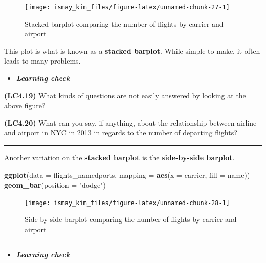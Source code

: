 \documentclass[]{tufte-book}
\newenvironment{Shaded}{\begin{snugshade}}{\end{snugshade}}
\newcommand{\KeywordTok}[1]{\textcolor[rgb]{0.13,0.29,0.53}{\textbf{{#1}}}}
\newcommand{\DataTypeTok}[1]{\textcolor[rgb]{0.13,0.29,0.53}{{#1}}}
\newcommand{\StringTok}[1]{\textcolor[rgb]{0.31,0.60,0.02}{{#1}}}
\newcommand{\NormalTok}[1]{{#1}}
\newenvironment{rmdblock}[1]
  {\begin{shaded*}
  \begin{itemize}
  \renewcommand{\labelitemi}{
    \raisebox{-.7\height}[0pt][0pt]{
    }
  }
  \item
  }
  {
  \end{itemize}
  \end{shaded*}
  }
\newenvironment{learncheck}
  {\begin{rmdblock}{warning}}
  {\end{rmdblock}}
\begin{document}
\begin{figure}
\texttt{[image: ismay\_kim\_files/figure-latex/unnamed-chunk-27-1]} \caption[Stacked barplot comparing the number of flights by carrier and airport]{Stacked barplot comparing the number of flights by carrier and airport}\label{fig:unnamed-chunk-27}
\end{figure}

This plot is what is known as a \textbf{stacked barplot}. While simple
to make, it often leads to many problems.

\begin{learncheck}
\textbf{\emph{Learning check}}
\end{learncheck}

\textbf{(LC4.19)} What kinds of questions are not easily answered by
looking at the above figure?

\textbf{(LC4.20)} What can you say, if anything, about the relationship
between airline and airport in NYC in 2013 in regards to the number of
departing flights?

\begin{center}\rule{0.5\linewidth}{\linethickness}\end{center}

Another variation on the \textbf{stacked barplot} is the
\textbf{side-by-side barplot}.

\begin{Shaded}
\begin{Highlighting}[]
\KeywordTok{ggplot}\NormalTok{(}\DataTypeTok{data =} \NormalTok{flights_namedports, }\DataTypeTok{mapping =} \KeywordTok{aes}\NormalTok{(}\DataTypeTok{x =} \NormalTok{carrier, }\DataTypeTok{fill =} \NormalTok{name)) +}
\StringTok{  }\KeywordTok{geom_bar}\NormalTok{(}\DataTypeTok{position =} \StringTok{"dodge"}\NormalTok{)}
\end{Highlighting}
\end{Shaded}

\begin{figure}
\texttt{[image: ismay\_kim\_files/figure-latex/unnamed-chunk-28-1]} \caption[Side-by-side barplot comparing the number of flights by carrier and airport]{Side-by-side barplot comparing the number of flights by carrier and airport}\label{fig:unnamed-chunk-28}
\end{figure}

\begin{center}\rule{0.5\linewidth}{\linethickness}\end{center}

\begin{learncheck}
\textbf{\emph{Learning check}}
\end{learncheck}
\end{document}
